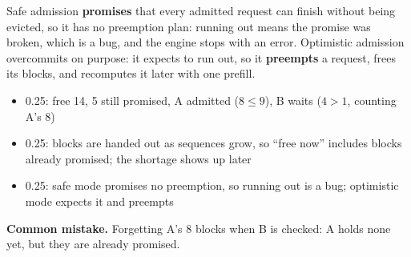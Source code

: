 \documentclass[10pt]{article}
\newenvironment{rubric}{%
  \begin{tcolorbox}[colback=black!4, colframe=black!40, boxrule=0.4pt,
                    arc=0pt, title={Rubric}, fonttitle=\bfseries\small,
                    coltitle=black, colbacktitle=black!12]
  \small\begin{itemize}[leftmargin=*, nosep]}{%
  \end{itemize}\end{tcolorbox}}
\begin{document}
Safe admission \textbf{promises} that every admitted request can finish
without being evicted, so it has no preemption plan: running out means
the promise was broken, which is a bug, and the engine stops with an
error. Optimistic admission overcommits on purpose: it expects to run
out, so it \textbf{preempts} a request, frees its blocks, and recomputes
it later with one prefill.

\begin{rubric}
\item 0.25: free 14, 5 still promised, A admitted ($8 \le 9$), B waits
  ($4 > 1$, counting A's 8)
\item 0.25: blocks are handed out as sequences grow, so ``free now''
  includes blocks already promised; the shortage shows up later
\item 0.25: safe mode promises no preemption, so running out is a bug;
  optimistic mode expects it and preempts
\end{rubric}

\textbf{Common mistake.} Forgetting A's 8 blocks when B is checked:
A holds none yet, but they are already promised.
\end{document}
